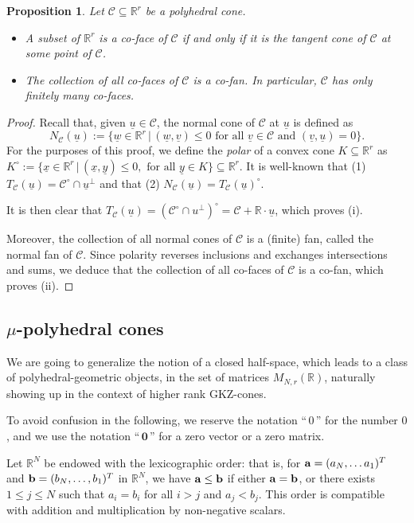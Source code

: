 \documentclass[12pt, a4article]{amsart}   	%
\numberwithin{equation}{section}
\theoremstyle{plain}
\newtheorem{proposition}[theorem]{Proposition}
\theoremstyle{definition}
\newcommand{\R}{{\mathbb R}}
\newcommand{\bfa}{{\bf a}}
\newcommand{\bfb}{{\bf b}}
\newcommand{\mcC}{{\mathcal C}}
\newcommand{\uu}{{\underline u}}
\newcommand{\uv}{{\underline v}}
\newcommand{\uw}{{\underline w}}
\newcommand{\ux}{{\underline x}}
\newcommand{\uy}{{\underline y}}
\begin{document}
\begin{proposition}\label{prp:coface-cofan}
Let $\mcC\subseteq\R^r$ be a polyhedral cone.
\begin{itemize}
\item[(i)] A subset of $\mathbb{R}^r$ is a co-face of $\mcC$ if and only if it is the tangent cone of $\mcC$ at some point of $\mcC$.
\item[(ii)] The collection of all co-faces of $\mcC$ is a co-fan. In particular, $\mcC$ has only finitely many co-faces.
\end{itemize}
\end{proposition}
\begin{proof}
Recall that, given $\uu\in\mcC$, the normal cone of $\mcC$ at $\uu$ is defined as
\[
N_\mcC(\uu) := \{ \uw \in \mathbb{R}^r\,|\, (\uw,\uv)\leq 0\textrm{ for all }\uv\in\mcC\textrm{ and }(\uv,\uu) = 0\}.
\]
For the purposes of this proof, we define the \emph{polar} of a convex cone $K\subseteq\R^r$ as $K^\circ := \{\ux \in \R^r\,|\, (\ux,\uy)\leq 0, \textrm{ for all }\uy\in K\}\subseteq\R^r$. It is well-known that (1) $T_\mcC(\uu) = \mcC^\circ\cap \uu^\perp$ and that (2) $N_\mcC(\uu) = T_\mcC(\uu)^\circ$.

It is then clear that $T_\mcC(\uu) = (\mcC^\circ\cap u^\perp)^\circ = \mcC + \R\cdot\uu$, which proves (i).

Moreover, the collection of all normal cones of $\mcC$ is a (finite) fan, called the normal fan of $\mcC$. Since polarity reverses inclusions and exchanges intersections and sums, we deduce that the collection of all co-faces of $\mcC$ is a co-fan, which proves (ii).
\end{proof}

\subsection{$\mu$-polyhedral cones}

We are going to generalize the notion of a closed half-space, which leads to a class of polyhedral-geometric objects, in the set of matrices $M_{N,r}(\mathbb{R})$, naturally showing up in the context of higher rank GKZ-cones.

To avoid confusion in the following, we reserve the notation ``$\,0\,$'' for the number $0$, and we use the notation ``$\,\mathbf 0\,$'' for a zero vector or a zero matrix.

Let $\mathbb R^N$ be endowed with the lexicographic order: that is, for $\bfa = (a_N,\ldots a_1)^T$ and $\bfb = (b_N,\ldots, b_1)^T$ in $\R^N$, we have $\bfa \leq \bfb$ if either $\bfa = \bfb$, or there exists $1\leq j\leq N$ such that $a_i = b_i$ for all $i > j$ and $a_j < b_j$. This order is compatible with addition and multiplication by non-negative scalars.
\end{document}

